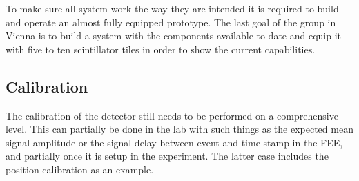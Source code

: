 \documentclass[../BTOF_summary.tex]{subfiles}
\begin{document}
To make sure all system work the way they are intended it is required to build and operate an almost fully equipped prototype.
The last goal of the group in Vienna is to build a system with the components available to date and equip it with five to ten scintillator tiles in order to show the current capabilities.

\subsection[]{Calibration}
The calibration of the detector still needs to be performed on a comprehensive level.
This can partially be done in the lab with such things as the expected mean signal amplitude or the signal delay between event and time stamp in the FEE, and partially once it is setup in the experiment.
The latter case includes the position calibration as an example.
\end{document}
